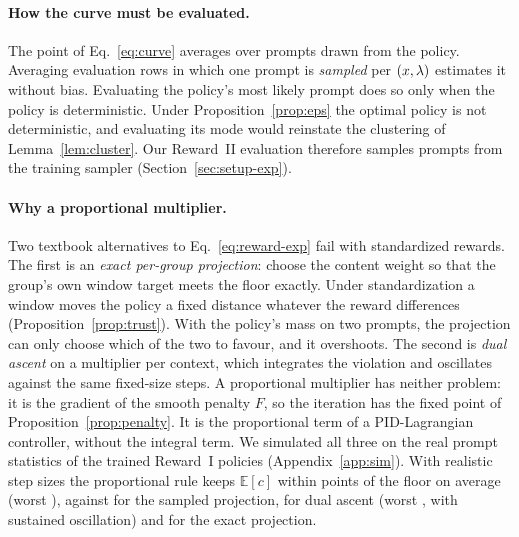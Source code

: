 \paragraph{How the curve must be evaluated.}
The point of Eq.~\eqref{eq:curve} averages over prompts drawn from the policy.
Averaging evaluation rows in which one prompt is \emph{sampled} per
$(x,\lambda)$ estimates it without bias. Evaluating the policy's most likely prompt
does so only when the policy is deterministic. Under
Proposition~\ref{prop:eps} the optimal policy is not deterministic, and
evaluating its mode would reinstate the clustering of Lemma~\ref{lem:cluster}.
Our Reward~II evaluation therefore samples prompts from the training sampler
(Section~\ref{sec:setup-exp}).

\paragraph{Why a proportional multiplier.}
Two textbook alternatives to Eq.~\eqref{eq:reward-exp} fail with standardized
rewards. The first is an \emph{exact per-group projection}: choose the content
weight so that the group's own window target meets the floor exactly. Under
standardization a window moves the policy a fixed distance whatever the reward
differences (Proposition~\ref{prop:trust}). With the policy's mass on two
prompts, the projection can only choose which of the two to favour, and it
overshoots. The second is \emph{dual ascent} on a multiplier per context, which
integrates the violation and oscillates against the same fixed-size steps. A
proportional multiplier has neither problem: it is the gradient of the smooth
penalty $F$, so the iteration has the fixed point of
Proposition~\ref{prop:penalty}. It is the proportional term of a PID-Lagrangian
controller, without the integral term. We simulated all three on the real prompt
statistics of the trained Reward~I policies
(Appendix~\ref{app:sim}). With realistic step sizes the proportional rule keeps
$\mathbb{E}[c]$ within \simPfiveCalib{} points of the floor on average (worst
\simPfiveWorst), against \simProjCalib{} for the sampled projection,
\simDualCalib{} for dual ascent (worst \simDualWorst, with sustained
oscillation) and \simExactCalib{} for the exact projection.

